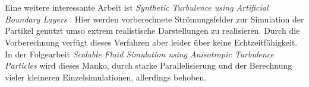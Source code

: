 \begin{Spacing}{\mylinespace}
\\\\
Eine weitere interessante Arbeit ist \textit{Synthetic Turbulence using Artificial Boundary Layers} \cite{Pfaff2009}. Hier werden vorberechnete Strömungsfelder zur Simulation der Partikel genutzt umso extrem realistische Darstellungen zu realisieren. Durch die Vorberechnung verfügt dieses Verfahren aber leider über keine Echtzeitfähigkeit. In der Folgearbeit \textit{Scalable Fluid Simulation using Anisotropic Turbulence Particles} \cite{Pfaff2010} wird dieses Manko, durch starke Parallelisierung und der Berechnung vieler kleineren Einzelsimulationen, allerdings behoben.



\end{Spacing}
\newpage
\clearpage
